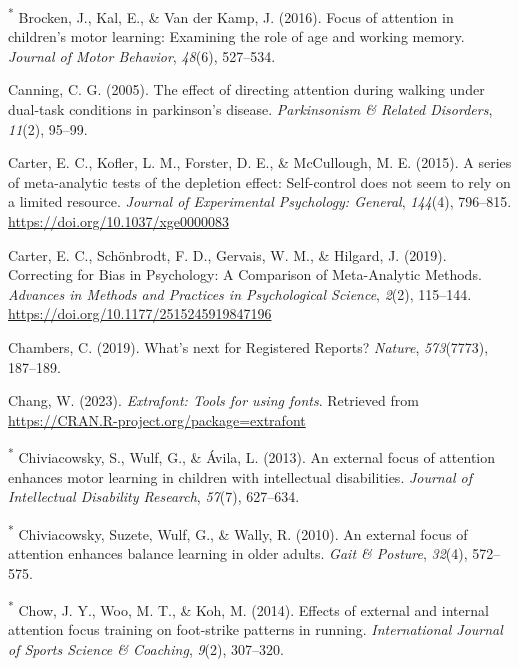 \documentclass[
  man, donotrepeattitle,floatsintext]{apa7}
\newlength{\cslhangindent}
\newlength{\cslentryspacingunit} %
\newenvironment{CSLReferences}[2] %
 {%
  \setlength{\parindent}{0pt}
  \ifodd #1
  \let\oldpar\par
  \def\par{\hangindent=\cslhangindent\oldpar}
  \fi
  \setlength{\parskip}{#2\cslentryspacingunit}
 }%
 {}
\begin{document}
\begin{CSLReferences}{1}{0}
\leavevmode{}%
\textsuperscript{*} Brocken, J., Kal, E., \& Van der Kamp, J. (2016). Focus of attention in children's motor learning: Examining the role of age and working memory. \emph{Journal of Motor Behavior}, \emph{48}(6), 527--534.

\leavevmode{}%
Canning, C. G. (2005). The effect of directing attention during walking under dual-task conditions in parkinson's disease. \emph{Parkinsonism \& Related Disorders}, \emph{11}(2), 95--99.

\leavevmode{}%
Carter, E. C., Kofler, L. M., Forster, D. E., \& McCullough, M. E. (2015). A series of meta-analytic tests of the depletion effect: {Self-control} does not seem to rely on a limited resource. \emph{Journal of Experimental Psychology: General}, \emph{144}(4), 796--815. \url{https://doi.org/10.1037/xge0000083}

\leavevmode{}%
Carter, E. C., Schönbrodt, F. D., Gervais, W. M., \& Hilgard, J. (2019). Correcting for {Bias} in {Psychology}: {A Comparison} of {Meta-Analytic Methods}. \emph{Advances in Methods and Practices in Psychological Science}, \emph{2}(2), 115--144. \url{https://doi.org/10.1177/2515245919847196}

\leavevmode{}%
Chambers, C. (2019). What's next for {Registered Reports}? \emph{Nature}, \emph{573}(7773), 187--189.

\leavevmode{}%
Chang, W. (2023). \emph{Extrafont: Tools for using fonts}. Retrieved from \url{https://CRAN.R-project.org/package=extrafont}

\leavevmode{}%
\textsuperscript{*} Chiviacowsky, S., Wulf, G., \& Ávila, L. (2013). An external focus of attention enhances motor learning in children with intellectual disabilities. \emph{Journal of Intellectual Disability Research}, \emph{57}(7), 627--634.

\leavevmode{}%
\textsuperscript{*} Chiviacowsky, Suzete, Wulf, G., \& Wally, R. (2010). An external focus of attention enhances balance learning in older adults. \emph{Gait \& Posture}, \emph{32}(4), 572--575.

\leavevmode{}%
\textsuperscript{*} Chow, J. Y., Woo, M. T., \& Koh, M. (2014). Effects of external and internal attention focus training on foot-strike patterns in running. \emph{International Journal of Sports Science \& Coaching}, \emph{9}(2), 307--320.


\end{CSLReferences}
\end{document}
